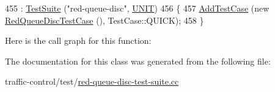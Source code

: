 \begin{DoxyCode}
455     : \hyperlink{classns3_1_1TestSuite_a904b0c40583b744d30908aeb94636d1a}{TestSuite} (\textcolor{stringliteral}{"red-queue-disc"}, \hyperlink{classns3_1_1TestSuite_a1ebfcab34ec8161e085e8e3a1855eae0a3885375a3787abf60431f8454b3cadbd}{UNIT})
456   \{
457     \hyperlink{classns3_1_1TestCase_a3718088e3eefd5d6454569d2e0ddd835}{AddTestCase} (\textcolor{keyword}{new} \hyperlink{classRedQueueDiscTestCase}{RedQueueDiscTestCase} (), TestCase::QUICK);
458   \}
\end{DoxyCode}


Here is the call graph for this function\+:




The documentation for this class was generated from the following file\+:\begin{DoxyCompactItemize}
\item 
traffic-\/control/test/\hyperlink{red-queue-disc-test-suite_8cc}{red-\/queue-\/disc-\/test-\/suite.\+cc}\end{DoxyCompactItemize}
